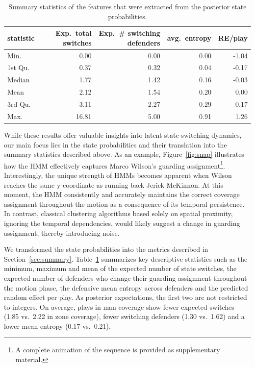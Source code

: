 \documentclass[namedate,webpdf,modern,medium]{oup-authoring-template}
\begin{document}
\begin{table}[!t]
\caption{Summary statistics of the features that were extracted from the posterior state probabilities.}
\label{tab:state_decod}
\centering
\begin{tabular}[t]{lrrrr}
\hline
statistic & Exp.\ total switches & Exp.\ \# switching defenders & avg.\ entropy & RE/play\\
\hline
Min. & 0.00 & 0.00 & 0.00 & -1.04\\
1st Qu. & 0.37 & 0.32 & 0.04 & -0.17\\
Median & 1.77 & 1.42 & 0.16 & -0.03\\
Mean & 2.12 & 1.54 & 0.20 & 0.00\\
3rd Qu. & 3.11 & 2.27 & 0.29 & 0.17\\
Max. & 16.81 & 5.00 & 0.91 & 1.26\\
\hline
\end{tabular}
\end{table}

While these results offer valuable insights into latent state-switching dynamics, our main focus lies in the state probabilities and their translation into the summary statistics described above. As an example, Figure~\ref{fig:snap} illustrates how the HMM effectively captures Marco Wilson's guarding assignment\footnote{A complete animation of the sequence is provided as supplementary material.}. Interestingly, the unique strength of HMMs becomes apparent when Wilson reaches the same $\mathrm{y}$-coordinate as running back Jerick McKinnon. At this moment, the HMM consistently and accurately maintains the correct coverage assignment throughout the motion as a consequence of its temporal persistence. In contrast, classical clustering algorithms based solely on spatial proximity, ignoring the temporal dependencies, would likely suggest a change in guarding assignment, thereby introducing noise. 

We transformed the state probabilities into the metrics described in Section~\ref{sec:summary}. Table~\ref{tab:state_decod} summarizes key descriptive statistics such as the minimum, maximum and mean of the expected number of state switches, the expected number of defenders who change their guarding assignment throughout the motion phase, the defensive mean entropy across defenders and the predicted random effect per play. As posterior expectations, the first two are not restricted to integers. On average, plays in man coverage show fewer expected switches (1.85 vs.\ 2.22 in zone coverage), fewer switching defenders (1.30 vs.\ 1.62) and a lower mean entropy (0.17 vs.\ 0.21).
\end{document}

